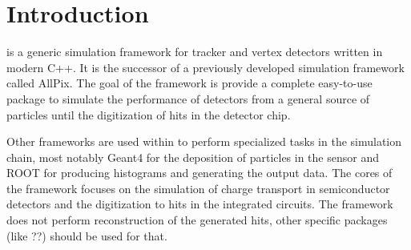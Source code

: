 \section{Introduction}
\label{sec:introduction}
\apsq is a generic simulation framework for tracker and vertex detectors written in modern C++. It is the successor of a previously developed simulation framework called AllPix\cite{ap1wiki}\cite{ap1git}. The goal of the \apsq framework is provide a complete easy-to-use package to simulate the performance of detectors from a general source of particles until the digitization of hits in the detector chip. 

Other frameworks are used within \apsq to perform specialized tasks in the simulation chain, most notably Geant4\cite{geant4} for the deposition of particles in the sensor and ROOT\cite{root} for producing histograms and generating the output data. The cores of the framework focuses on the simulation of charge transport in semiconductor detectors and the digitization to hits in the integrated circuits. The framework does not perform reconstruction of the generated hits, other specific packages (like ??) should be used for that.


